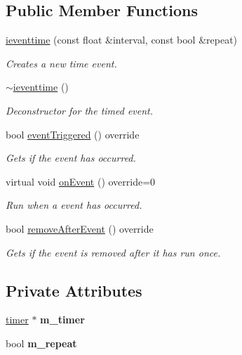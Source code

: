 \subsection*{Public Member Functions}
\begin{DoxyCompactItemize}
\item 
\hyperlink{classflounder_1_1ieventtime_ac781f0bdc08d44be5624f4ca2e914465}{ieventtime} (const float \&interval, const bool \&repeat)
\begin{DoxyCompactList}\small\item\em Creates a new time event. \end{DoxyCompactList}\item 
\hyperlink{classflounder_1_1ieventtime_a46e4e4db632e26683d5acdf0fc658e2d}{$\sim$ieventtime} ()
\begin{DoxyCompactList}\small\item\em Deconstructor for the timed event. \end{DoxyCompactList}\item 
bool \hyperlink{classflounder_1_1ieventtime_a471aad4d2412507875077747ea9ea7a6}{event\+Triggered} () override
\begin{DoxyCompactList}\small\item\em Gets if the event has occurred. \end{DoxyCompactList}\item 
virtual void \hyperlink{classflounder_1_1ieventtime_abef43da596dc22fc9b7104fff88c1a9d}{on\+Event} () override=0
\begin{DoxyCompactList}\small\item\em Run when a event has occurred. \end{DoxyCompactList}\item 
bool \hyperlink{classflounder_1_1ieventtime_af64c856310e8249439d0c847943e3490}{remove\+After\+Event} () override
\begin{DoxyCompactList}\small\item\em Gets if the event is removed after it has run once. \end{DoxyCompactList}\end{DoxyCompactItemize}
\subsection*{Private Attributes}
\begin{DoxyCompactItemize}
\item 
\mbox{\label{classflounder_1_1ieventtime_a2261aeb7c3a5ced2d3f6f5e710791abe}} 
\hyperlink{classflounder_1_1timer}{timer} $\ast$ {\bfseries m\+\_\+timer}
\item 
\mbox{\label{classflounder_1_1ieventtime_af597d16a0aa78650638851e391f47369}} 
bool {\bfseries m\+\_\+repeat}
\end{DoxyCompactItemize}


